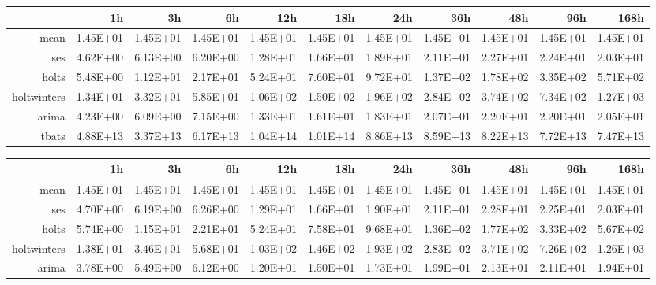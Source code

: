 \begin{landscape}
\begin{table}[ht]
\centering
\begin{tabular}{rrrrrrrrrrr}
  \hline
 & 1h & 3h & 6h & 12h & 18h & 24h & 36h & 48h & 96h & 168h \\ 
  \hline
mean & 1.45E+01 & 1.45E+01 & 1.45E+01 & 1.45E+01 & 1.45E+01 & 1.45E+01 & 1.45E+01 & 1.45E+01 & 1.45E+01 & 1.45E+01 \\ 
  ses & 4.62E+00 & 6.13E+00 & 6.20E+00 & 1.28E+01 & 1.66E+01 & 1.89E+01 & 2.11E+01 & 2.27E+01 & 2.24E+01 & 2.03E+01 \\ 
  holts & 5.48E+00 & 1.12E+01 & 2.17E+01 & 5.24E+01 & 7.60E+01 & 9.72E+01 & 1.37E+02 & 1.78E+02 & 3.35E+02 & 5.71E+02 \\ 
  holtwinters & 1.34E+01 & 3.32E+01 & 5.85E+01 & 1.06E+02 & 1.50E+02 & 1.96E+02 & 2.84E+02 & 3.74E+02 & 7.34E+02 & 1.27E+03 \\ 
  arima & 4.23E+00 & 6.09E+00 & 7.15E+00 & 1.33E+01 & 1.61E+01 & 1.83E+01 & 2.07E+01 & 2.20E+01 & 2.20E+01 & 2.05E+01 \\ 
  tbats & 4.88E+13 & 3.37E+13 & 6.17E+13 & 1.04E+14 & 1.01E+14 & 8.86E+13 & 8.59E+13 & 8.22E+13 & 7.72E+13 & 7.47E+13 \\ 
   \hline
\end{tabular}
\end{table}
\begin{table}[ht]
\centering
\begin{tabular}{rrrrrrrrrrr}
  \hline
 & 1h & 3h & 6h & 12h & 18h & 24h & 36h & 48h & 96h & 168h \\ 
  \hline
mean & 1.45E+01 & 1.45E+01 & 1.45E+01 & 1.45E+01 & 1.45E+01 & 1.45E+01 & 1.45E+01 & 1.45E+01 & 1.45E+01 & 1.45E+01 \\ 
  ses & 4.70E+00 & 6.19E+00 & 6.26E+00 & 1.29E+01 & 1.66E+01 & 1.90E+01 & 2.11E+01 & 2.28E+01 & 2.25E+01 & 2.03E+01 \\ 
  holts & 5.74E+00 & 1.15E+01 & 2.21E+01 & 5.24E+01 & 7.58E+01 & 9.68E+01 & 1.36E+02 & 1.77E+02 & 3.33E+02 & 5.67E+02 \\ 
  holtwinters & 1.38E+01 & 3.46E+01 & 5.68E+01 & 1.03E+02 & 1.46E+02 & 1.93E+02 & 2.83E+02 & 3.71E+02 & 7.26E+02 & 1.26E+03 \\ 
  arima & 3.78E+00 & 5.49E+00 & 6.12E+00 & 1.20E+01 & 1.50E+01 & 1.73E+01 & 1.99E+01 & 2.13E+01 & 2.11E+01 & 1.94E+01 \\ 

\end{tabular}
\end{table}
\end{landscape}
